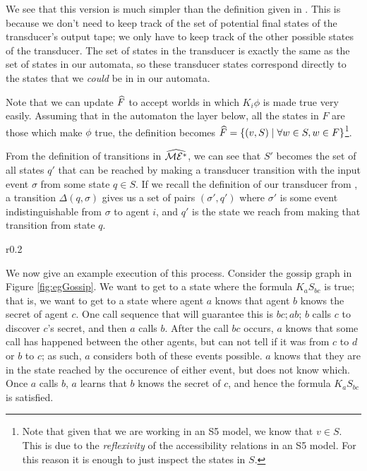 \documentclass[10pt, a4paper]{report}
\begin{document}
We see that this version is much simpler than the definition given in
. This is because we don't need to keep track of the
set of potential final states of the transducer's output tape; we only have to
keep track of the other possible states of the transducer. The set of states in
the transducer is exactly the same as the set of states in our \mestar automata,
so these transducer states correspond directly to the states that we
\emph{could} be in in our \mestar automata.

Note that we can update $\widehat{F}$ to accept worlds in which $K_i \phi$ is made
true very easily. Assuming that in the automaton the layer below, all the states
in $F$ are those which make $\phi$ true, the definition becomes $\widehat{F} =
\left\{ (v, S) \mid \forall w \in S, w \in F \right\}$\footnote{Note that given
  that we are working in an \textsf{S5} model, we know that $v \in S$. This is
  due to the \emph{reflexivity} of the accessibility relations in an \textsf{S5}
model. For this reason it is enough to just inspect the states in $S$.}.

From the definition of transitions in $\widehat{\mathcal{ME^\ast}}$, we can see that $S'$
becomes the set of all states $q'$ that can be reached by making a transducer
transition with the input event $\sigma$ from some state $q \in S$. If we recall
the definition of our transducer from , a
transition $\Delta(q, \sigma)$ gives us a set of pairs $(\sigma', q')$ where
$\sigma'$ is some event indistinguishable from $\sigma$ to agent $i$, and $q'$
is the state we reach from making that transition from state $q$.

\begin{wrapfigure}{r}{0.2\textwidth}
  \centering
  \caption{}
  \label{fig:egGossip}
\end{wrapfigure}

We now give an example execution of this process. Consider the gossip graph in
Figure \ref{fig:egGossip}. We want to get to a state where the formula $K_a
S_{bc}$ is true; that is, we want to get to a state where agent $a$ knows that
agent $b$ knows the secret of agent $c$. One call sequence that will guarantee
this is $bc; ab$; $b$ calls $c$ to discover $c$'s secret, and then $a$ calls
$b$. After the call $bc$ occurs, $a$ knows that some call has happened between
the other agents, but can not tell if it was from $c$ to $d$ or $b$ to $c$; as
such, $a$ considers both of these events possible. $a$ knows that they are in
the state reached by the occurence of either event, but does not know which.
Once $a$ calls $b$, $a$ learns that $b$ knows the secret of $c$, and hence the
formula $K_a S_{bc}$ is satisfied. 
\end{document}
